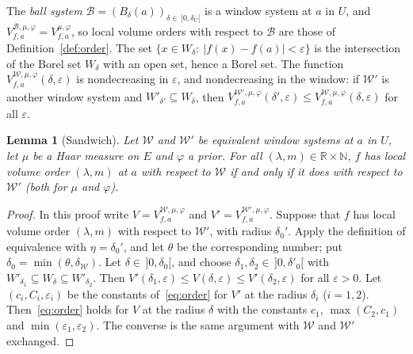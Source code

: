 \documentclass[11pt,a4paper]{article}
\newtheorem{lemma}[theorem]{Lemma}
\theoremstyle{definition}
\theoremstyle{remark}
\numberwithin{equation}{section}
\newcommand{\N}{\mathbb{N}}
\newcommand{\R}{\mathbb{R}}
\newcommand{\abs}[1]{\lvert #1\rvert}
\newcommand{\eps}{\varepsilon}
\begin{document}
The \emph{ball system} $\mathcal B=(B_\delta(a))_{\delta\in\,]0,\delta_U[}$ is a window system at $a$ in $U$, and $V^{\mathcal B,\mu,\varphi}_{f,a}=V^{\mu,\varphi}_{f,a}$, so local volume orders with respect to $\mathcal B$ are those of Definition~\ref{def:order}. The set $\{x\in W_\delta:\ \abs{f(x)-f(a)}<\eps\}$ is the intersection of the Borel set $W_\delta$ with an open set, hence a Borel set. The function $V^{\mathcal W,\mu,\varphi}_{f,a}(\delta,\eps)$ is nondecreasing in $\eps$, and nondecreasing in the window: if $\mathcal W'$ is another window system and $W'_{\delta'}\subseteq W_\delta$, then $V^{\mathcal W',\mu,\varphi}_{f,a}(\delta',\eps)\le V^{\mathcal W,\mu,\varphi}_{f,a}(\delta,\eps)$ for all $\eps$.

\begin{lemma}[Sandwich]\label{lem:sandwich}
Let $\mathcal W$ and $\mathcal W'$ be equivalent window systems at $a$ in $U$, let $\mu$ be a Haar measure on $E$ and $\varphi$ a prior. For all $(\lambda,m)\in\R\times\N$, $f$ has local volume order $(\lambda,m)$ at $a$ with respect to $\mathcal W$ if and only if it does with respect to $\mathcal W'$ (both for $\mu$ and $\varphi$).
\end{lemma}
\begin{proof}
In this proof write $V=V^{\mathcal W,\mu,\varphi}_{f,a}$ and $V'=V^{\mathcal W',\mu,\varphi}_{f,a}$. Suppose that $f$ has local volume order $(\lambda,m)$ with respect to $\mathcal W'$, with radius $\delta_0'$. Apply the definition of equivalence with $\eta=\delta_0'$, and let $\theta$ be the corresponding number; put $\delta_0=\min(\theta,\delta_{\mathcal W})$. Let $\delta\in\,]0,\delta_0[$, and choose $\delta_1,\delta_2\in\,]0,\delta'_0[$ with $W'_{\delta_1}\subseteq W_\delta\subseteq W'_{\delta_2}$. Then $V'(\delta_1,\eps)\le V(\delta,\eps)\le V'(\delta_2,\eps)$ for all $\eps>0$. Let $(c_i,C_i,\eps_i)$ be the constants of~\eqref{eq:order} for $V'$ at the radius $\delta_i$ ($i=1,2$). Then~\eqref{eq:order} holds for $V$ at the radius $\delta$ with the constants $c_1$, $\max(C_2,c_1)$ and $\min(\eps_1,\eps_2)$. The converse is the same argument with $\mathcal W$ and $\mathcal W'$ exchanged.
\end{proof}
\end{document}
